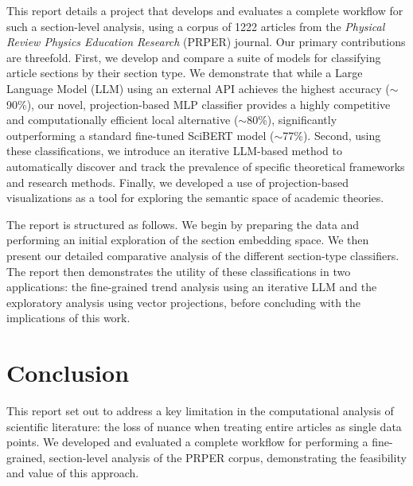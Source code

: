 \documentclass[12pt]{article}
\begin{document}
This report details a project that develops and evaluates a complete workflow for
such a section-level analysis, using a corpus of 1222 articles from the
\emph{Physical Review Physics Education Research} (PRPER) journal. Our primary
contributions are threefold. First, we develop and compare a suite of models for
classifying article sections by their section type. We demonstrate that while a
Large Language Model (LLM) using an external API achieves the highest accuracy
($\sim$90\%), our novel, projection-based MLP classifier provides a highly
competitive and computationally efficient local alternative ($\sim$80\%),
significantly outperforming a standard fine-tuned SciBERT model ($\sim$77\%).
Second, using these classifications, we introduce an iterative LLM-based method
to automatically discover and track the prevalence of specific theoretical
frameworks and research methods. Finally, we developed a use of projection-based
visualizations as a tool for exploring the semantic space of academic theories.

The report is structured as follows. We begin by preparing the data and
performing an initial exploration of the section embedding space. We then present
our detailed comparative analysis of the different section-type classifiers. The
report then demonstrates the utility of these classifications in two applications:
the fine-grained trend analysis using an iterative LLM and the exploratory
analysis using vector projections, before concluding with the implications of
this work.













\section{Conclusion}

This report set out to address a key limitation in the computational analysis of scientific literature: the loss of nuance when treating entire articles as single data points. We developed and evaluated a complete workflow for performing a fine-grained, section-level analysis of the PRPER corpus, demonstrating the feasibility and value of this approach.
\end{document}

